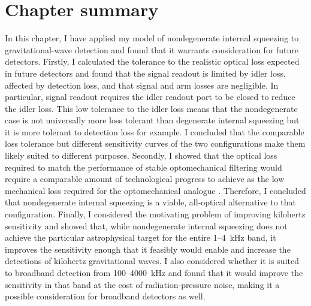 \section{Chapter summary}

In this chapter, I have applied my model of nondegenerate internal squeezing to gravitational-wave detection and found that it warrants consideration for future detectors.
Firstly, I calculated the tolerance to the realistic optical loss expected in future detectors and found that the signal readout is limited by idler loss, affected by detection loss, and that signal and arm losses are negligible. In particular, signal readout requires the idler readout port to be closed to reduce the idler loss. This low tolerance to the idler loss means that the nondegenerate case is not universally more loss tolerant than degenerate internal squeezing but it is more tolerant to detection loss for example. I concluded that the comparable loss tolerance but different sensitivity curves of the two configurations make them likely suited to different purposes. 
Secondly, I showed that the optical loss required to match the performance of stable optomechanical filtering would require a comparable amount of technological progress to achieve as the low mechanical loss required for the optomechanical analogue . Therefore, I concluded that nondegenerate internal squeezing is a viable, all-optical alternative to that configuration.
Finally, I considered the motivating problem of improving kilohertz sensitivity and showed that, while nondegenerate internal squeezing does not achieve the particular astrophysical target for the entire 1--4~kHz band, it improves the sensitivity enough that it feasibly would enable and increase the detections of kilohertz gravitational waves. I also considered whether it is suited to broadband detection from 100--4000~kHz and found that it would improve the sensitivity in that band at the cost of radiation-pressure noise, making it a possible consideration for broadband detectors as well.



